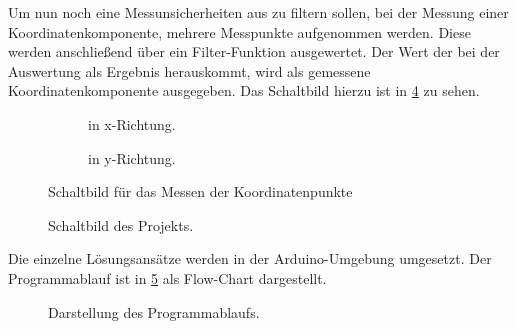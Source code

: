 Um nun noch eine Messunsicherheiten aus zu filtern sollen, bei der Messung einer Koordinatenkomponente, mehrere Messpunkte aufgenommen werden.
Diese werden anschließend über ein Filter-Funktion ausgewertet.
Der Wert der bei der Auswertung als Ergebnis herauskommt, wird als gemessene Koordinatenkomponente ausgegeben.
Das Schaltbild hierzu ist in \cref{fig:schaltbild} zu sehen.

\begin{figure}[ht!]
    \begin{subfigure}{0.49\textwidth}
        \centering
        \caption{in x-Richtung.}
        \label{fig:xlesen}
    \end{subfigure}
    \hfill
    \begin{subfigure}{0.49\textwidth}
        \centering
        \caption{in y-Richtung.}
        \label{fig:ylesen}
    \end{subfigure}
    \caption{Schaltbild für das Messen der Koordinatenpunkte}
    \label{fig:xylesen}
\end{figure}
\begin{figure}[ht!]
    \centering
    \caption{Schaltbild des Projekts.}
    \label{fig:schaltbild}
\end{figure}
Die einzelne Lösungsansätze werden in der Arduino-Umgebung umgesetzt.
Der Programmablauf ist in \cref{fig:flowchart} als Flow-Chart dargestellt.

\begin{figure}
    \centering
    \caption{Darstellung des Programmablaufs.}
    \label{fig:flowchart}
\end{figure}
